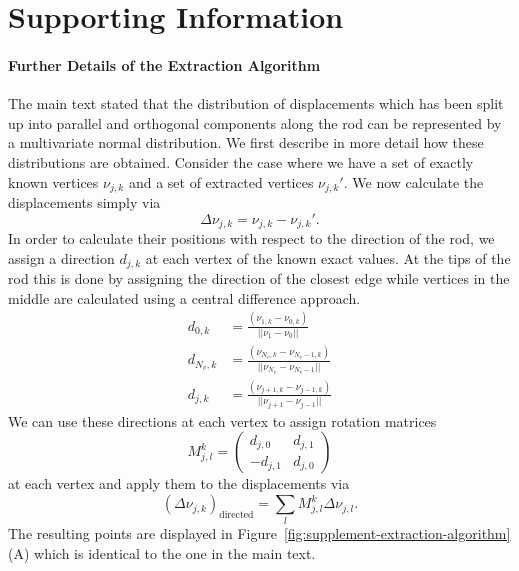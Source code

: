 \newpage

\section*{Supporting Information}

\paragraph*{Further Details of the Extraction Algorithm}
\label{sec:supplement-extraction-algorithm}

The main text stated that the distribution of displacements which has been split up
into parallel
and orthogonal components along the rod can be represented by a multivariate normal
distribution.
We first describe in more detail how these distributions are obtained.
Consider the case where we have a set of exactly known vertices $\nu_{j,k}$ and a set
of extracted
vertices $\nu_{j,k}'$.
We now calculate the displacements simply via
\begin{equation}
    \Delta \nu_{j,k} = \nu_{j,k} - \nu_{j,k}'.
\end{equation}
In order to calculate their positions with respect to the direction of the rod, we assign a
direction $d_{j,k}$ at each vertex of the known exact values.
At the tips of the rod this is done by assigning the direction of the closest edge
while vertices in
the middle are calculated using a central difference approach.
\begin{align}
    d_{0,k} &= \frac{(\nu_{1,k}-\nu_{0,k})}{||\nu_1 - \nu_0||}\\
    d_{N_v,k} &= \frac{(\nu_{N_v,k}-\nu_{N_v-1,k})}{||\nu_{N_v} - \nu_{N_v-1}||}\\
    d_{j,k} &= \frac{(\nu_{j+1,k}-\nu_{j-1,k})}{||\nu_{j+1} - \nu_{j-1}||}
\end{align}
We can use these directions at each vertex to assign rotation matrices
\begin{equation}
    M_{j,l}^k =
    \begin{pmatrix}
        d_{j,0} & d_{j,1}\\
        -d_{j,1} & d_{j,0}
    \end{pmatrix}
\end{equation}
at each vertex and apply them to the displacements via
\begin{equation}
    (\Delta\nu_{j,k})_\text{directed} = \sum\limits_l M_{j,l}^k \Delta\nu_{j,l}.
\end{equation}
The resulting points are displayed in
Figure~\ref{fig:supplement-extraction-algorithm} (A) which is
identical to the one in the main text.

